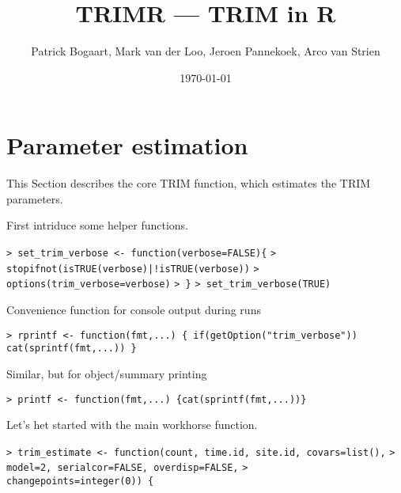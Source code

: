 \documentclass[a4paper]{article}
\begin{document}
\let\Sum=\sum
\newcommand{\diag}[1]{\operatorname{diag}(#1)}
\newcommand{\var}[1]{\operatorname{var}(#1)}
\newcommand{\cov}[1]{\operatorname{cov}(#1)}
\newcommand{\se}[1]{\operatorname{S.E.}(#1)}
\newcommand{\Mu}{{\mu_{+}}}
\title{TRIMR --- TRIM in R}
\author{Patrick Bogaart, Mark van der Loo, Jeroen Pannekoek, Arco van Strien}
\date{\today}
\maketitle
\tableofcontents 



\section{Parameter estimation}\par

This Section describes the core TRIM function, which estimates the TRIM parameters.\par

First intriduce some helper functions.\par
\verb~> set_trim_verbose <- function(verbose=FALSE){~\newline
\verb~>   stopifnot(isTRUE(verbose)|!isTRUE(verbose))~\newline
\verb~>   options(trim_verbose=verbose)~\newline
\verb~> }~\newline
\verb~> set_trim_verbose(TRUE)~\par

Convenience function for console output during runs\par
\verb~> rprintf <- function(fmt,...) { if(getOption("trim_verbose")) cat(sprintf(fmt,...)) }~\par

Similar, but for object/summary printing\par
\verb~> printf <- function(fmt,...) {cat(sprintf(fmt,...))}~\par

Let's het started with the main workhorse function.\par

\verb~> trim_estimate <- function(count, time.id, site.id, covars=list(),~\newline
\verb~>             model=2, serialcor=FALSE, overdisp=FALSE,~\newline
\verb~>             changepoints=integer(0)) {~\par
\end{document}

